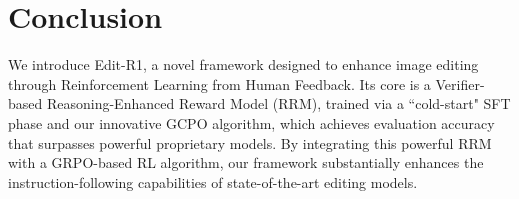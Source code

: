 \section{Conclusion}

We introduce Edit-R1, a novel framework designed to enhance image editing through Reinforcement Learning from Human Feedback. Its core is a Verifier-based Reasoning-Enhanced Reward Model (RRM), trained via a ``cold-start" SFT phase and our innovative GCPO algorithm, which achieves evaluation accuracy that surpasses powerful proprietary models. By integrating this powerful RRM with a GRPO-based RL algorithm, our framework substantially enhances the instruction-following capabilities of state-of-the-art editing models. 


